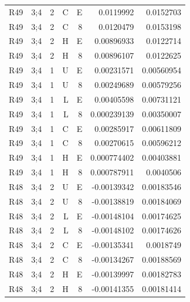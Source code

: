 {\begin{longtable}{@{}llrrrrr@{}}
R49 & 3;4 & 2 & C & E & 0.0119992 & 0.0152703 \\
R49 & 3;4 & 2 & C & 8 & 0.0120479 & 0.0153198 \\
R49 & 3;4 & 2 & H & E & 0.00896933 & 0.0122714 \\
R49 & 3;4 & 2 & H & 8 & 0.00896107 & 0.0122625 \\
R49 & 3;4 & 1 & U & E & 0.00231571 & 0.00560954 \\
R49 & 3;4 & 1 & U & 8 & 0.00249689 & 0.00579256 \\
R49 & 3;4 & 1 & L & E & 0.00405598 & 0.00731121 \\
R49 & 3;4 & 1 & L & 8 & 0.000239139 & 0.00350007 \\
R49 & 3;4 & 1 & C & E & 0.00285917 & 0.00611809 \\
R49 & 3;4 & 1 & C & 8 & 0.00270615 & 0.00596212 \\
R49 & 3;4 & 1 & H & E & 0.000774402 & 0.00403881 \\
R49 & 3;4 & 1 & H & 8 & 0.000787911 & 0.0040506 \\
R48 & 3;4 & 2 & U & E & -0.00139342 & 0.00183546 \\
R48 & 3;4 & 2 & U & 8 & -0.00138819 & 0.00184069 \\
R48 & 3;4 & 2 & L & E & -0.00148104 & 0.00174625 \\
R48 & 3;4 & 2 & L & 8 & -0.00148102 & 0.00174626 \\
R48 & 3;4 & 2 & C & E & -0.00135341 & 0.0018749 \\
R48 & 3;4 & 2 & C & 8 & -0.00134267 & 0.00188569 \\
R48 & 3;4 & 2 & H & E & -0.00139997 & 0.00182783 \\
R48 & 3;4 & 2 & H & 8 & -0.00141355 & 0.00181414 \\
\end{longtable}
}
